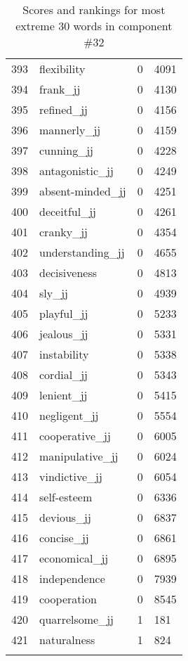 \begin{longtable}[!htbp]{| rlr@{.}l |}
    393 & flexibility & 0 & 4091 \\
    394 & frank\_jj & 0 & 4130 \\
    395 & refined\_jj & 0 & 4156 \\
    396 & mannerly\_jj & 0 & 4159 \\
    397 & cunning\_jj & 0 & 4228 \\
    398 & antagonistic\_jj & 0 & 4249 \\
    399 & absent-minded\_jj & 0 & 4251 \\
    400 & deceitful\_jj & 0 & 4261 \\
    401 & cranky\_jj & 0 & 4354 \\
    402 & understanding\_jj & 0 & 4655 \\
    403 & decisiveness & 0 & 4813 \\
    404 & sly\_jj & 0 & 4939 \\
    405 & playful\_jj & 0 & 5233 \\
    406 & jealous\_jj & 0 & 5331 \\
    407 & instability & 0 & 5338 \\
    408 & cordial\_jj & 0 & 5343 \\
    409 & lenient\_jj & 0 & 5415 \\
    410 & negligent\_jj & 0 & 5554 \\
    411 & cooperative\_jj & 0 & 6005 \\
    412 & manipulative\_jj & 0 & 6024 \\
    413 & vindictive\_jj & 0 & 6054 \\
    414 & self-esteem & 0 & 6336 \\
    415 & devious\_jj & 0 & 6837 \\
    416 & concise\_jj & 0 & 6861 \\
    417 & economical\_jj & 0 & 6895 \\
    418 & independence & 0 & 7939 \\
    419 & cooperation & 0 & 8545 \\
    420 & quarrelsome\_jj & 1 & 181 \\
    421 & naturalness & 1 & 824 \\
    \hline
    \caption{Scores and rankings for most extreme 30 words in component \#32} \\
\end{longtable}
